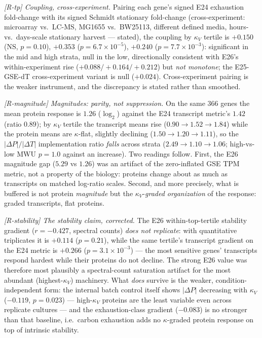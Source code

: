 \documentclass[11pt,a4paper]{article}
\theoremstyle{plain}
\theoremstyle{definition}
\theoremstyle{remark}
\begin{document}
\emph{[R-tp] Coupling, cross-experiment.} Pairing each gene's
signed E24 exhaustion fold-change with its signed Schmidt
stationary fold-change (cross-experiment: microarray vs.\ LC-MS,
MG1655 vs.\ BW25113, different defined media, hours- vs.\
days-scale stationary harvest --- stated), the coupling by
$\kappa_V$ tertile is $+0.150$ (NS, $p = 0.10$), $+0.353$ ($p =
6.7 \times 10^{-5}$), $+0.240$ ($p = 7.7 \times 10^{-3}$):
significant in the mid and high strata, null in the low,
directionally consistent with E26's within-experiment rise
($+0.088/+0.164/+0.212$) but \emph{not monotone}; the E25-GSE-dT
cross-experiment variant is null ($+0.024$). Cross-experiment
pairing is the weaker instrument, and the discrepancy is stated
rather than smoothed.

\emph{[R-magnitude] Magnitudes: parity, not suppression.} On the
same $366$ genes the mean protein response is $1.26$ ($\log_2$)
against the E24 transcript metric's $1.42$ (ratio $0.89$); by
$\kappa_V$ tertile the transcript means rise ($0.90 \to 1.52 \to
1.84$) while the protein means are $\kappa$-flat, slightly
declining ($1.50 \to 1.20 \to 1.11$), so the $|\Delta P|/|\Delta
T|$ implementation ratio \emph{falls} across strata ($2.49 \to
1.10 \to 1.06$; high-vs-low MWU $p = 1.0$ against an increase).
Two readings follow. First, the E26 magnitude gap ($5.29$ vs
$1.26$) was an artifact of the zero-inflated GSE TPM metric, not a
property of the biology: proteins change about as much as
transcripts on matched log-ratio scales. Second, and more
precisely, what is buffered is not protein \emph{magnitude} but
the $\kappa_V$-\emph{graded organization} of the response: graded
transcripts, flat proteins.

\emph{[R-stability] The stability claim, corrected.} The E26
within-top-tertile stability gradient ($r = -0.427$, spectral
counts) \emph{does not replicate}: with quantitative triplicates
it is $+0.114$ ($p = 0.21$), while the same tertile's transcript
gradient on the E24 metric is $+0.266$ ($p = 3.1 \times 10^{-3}$)
--- the most sensitive genes' transcripts respond hardest while
their proteins do not decline. The strong E26 value was therefore
most plausibly a spectral-count saturation artifact for the most
abundant (highest-$\kappa_V$) machinery. What \emph{does} survive
is the weaker, condition-independent form: the internal batch
control itself shows $|\Delta P|$ decreasing with $\kappa_V$
($-0.119$, $p = 0.023$) --- high-$\kappa_V$ proteins are the least
variable even across replicate cultures --- and the
exhaustion-class gradient ($-0.083$) is no stronger than that
baseline, i.e.\ carbon exhaustion adds no $\kappa$-graded protein
response on top of intrinsic stability.
\end{document}
